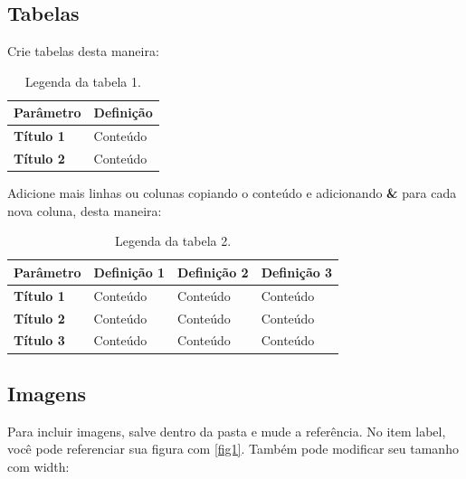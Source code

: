 \subsection{Tabelas}
Crie tabelas desta maneira:


\begin{table}[h!]
    \centering
  
    \label{tab:nometabela}
    \begin{tabular}{|l|p{10cm}|}
    \hline
    \textbf{Parâmetro} & \textbf{Definição} \\ \hline
    \textbf{Título 1}     & Conteúdo \\ \hline
  
    \textbf{Título 2}     & Conteúdo \\ \hline

    \end{tabular}
    \caption{Legenda da tabela 1.}
    \end{table}

Adicione mais linhas ou colunas copiando o conteúdo e adicionando \textbf{\&} para cada nova coluna, desta maneira: 

\begin{table}[h!]
    \centering
   
    \label{tab:nometabela2}
  \begin{tabular}{|l|p{3cm}|p{3cm}|p{3cm}|}

    \hline
    \textbf{Parâmetro} & \textbf{Definição 1} & \textbf{Definição 2} & \textbf{Definição 3} \\ \hline
    \textbf{Título 1}  & Conteúdo            & Conteúdo            & Conteúdo            \\ \hline
    \textbf{Título 2}  & Conteúdo            & Conteúdo            & Conteúdo            \\ \hline

    \textbf{Título 3}  & Conteúdo            & Conteúdo            & Conteúdo            \\ \hline

    
    \end{tabular}
     \caption{Legenda da tabela 2.}
\end{table}

\newpage

\subsection{Imagens}
Para incluir imagens, salve dentro da pasta e mude a referência. No item label, você pode referenciar sua figura com \ref{fig1}. Também pode modificar seu tamanho com width:


